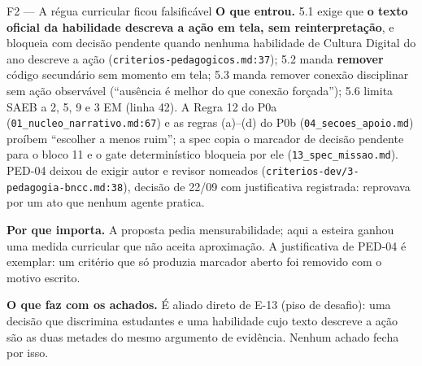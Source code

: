 \documentclass[11pt,a4paper]{article}
\begin{document}
\begin{creditobox}{F2 --- A régua curricular ficou falsificável}
\textbf{O que entrou.} 5.1 exige que \textbf{o texto oficial da habilidade descreva a ação em tela,
sem reinterpretação}, e bloqueia com decisão pendente quando nenhuma habilidade de Cultura Digital
do ano descreve a ação (\texttt{criterios-pedagogicos.md:37}); 5.2 manda \textbf{remover} código
secundário sem momento em tela; 5.3 manda remover conexão disciplinar sem ação observável
(``ausência é melhor do que conexão forçada''); 5.6 limita SAEB a 2\textordmasculine{},
5\textordmasculine{}, 9\textordmasculine{} e 3\textordmasculine{} EM (linha 42). A Regra 12 do
P0a (\texttt{01\_nucleo\_narrativo.md:67}) e as regras (a)--(d) do P0b (\texttt{04\_secoes\_apoio.md})
proíbem ``escolher a menos ruim''; a spec copia o marcador de decisão pendente para o bloco 11 e o
gate determinístico bloqueia por ele (\texttt{13\_spec\_missao.md}). PED-04 deixou de exigir autor e
revisor nomeados (\texttt{criterios-dev/3-pedagogia-bncc.md:38}), decisão de 22/09 com justificativa
registrada: reprovava por um ato que nenhum agente pratica.

\textbf{Por que importa.} A proposta pedia mensurabilidade; aqui a esteira ganhou uma medida
curricular que não aceita aproximação. A justificativa de PED-04 é exemplar: um critério que só
produzia marcador aberto foi removido com o motivo escrito.

\textbf{O que faz com os achados.} É aliado direto de E-13 (piso de desafio): uma decisão que
discrimina estudantes e uma habilidade cujo texto descreve a ação são as duas metades do mesmo
argumento de evidência. Nenhum achado fecha por isso.
\end{creditobox}
\end{document}
